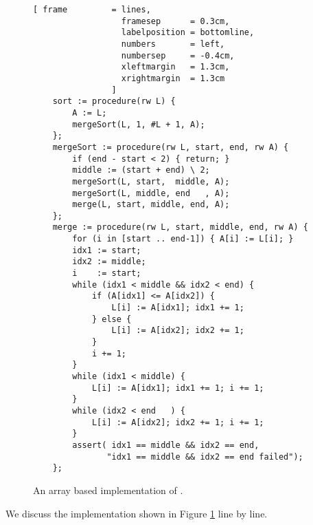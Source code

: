 \begin{figure}[!ht]
  \centering
\begin{Verbatim}[ frame         = lines, 
                  framesep      = 0.3cm, 
                  labelposition = bottomline,
                  numbers       = left,
                  numbersep     = -0.4cm,
                  xleftmargin   = 1.3cm,
                  xrightmargin  = 1.3cm
                ]
    sort := procedure(rw L) {
        A := L;
        mergeSort(L, 1, #L + 1, A); 
    };
    mergeSort := procedure(rw L, start, end, rw A) {
        if (end - start < 2) { return; }
        middle := (start + end) \ 2;
        mergeSort(L, start,  middle, A);  
        mergeSort(L, middle, end   , A);   
        merge(L, start, middle, end, A); 
    };
    merge := procedure(rw L, start, middle, end, rw A) {    
        for (i in [start .. end-1]) { A[i] := L[i]; }
        idx1 := start;
        idx2 := middle;
        i    := start;
        while (idx1 < middle && idx2 < end) {
            if (A[idx1] <= A[idx2]) {
                L[i] := A[idx1]; idx1 += 1;
            } else {
                L[i] := A[idx2]; idx2 += 1;
            }
            i += 1; 
        }
        while (idx1 < middle) { 
            L[i] := A[idx1]; idx1 += 1; i += 1; 
        }
        while (idx2 < end   ) { 
            L[i] := A[idx2]; idx2 += 1; i += 1; 
        }
        assert( idx1 == middle && idx2 == end, 
               "idx1 == middle && idx2 == end failed");
    };
\end{Verbatim}
\vspace*{-0.3cm}
  \caption{An array based implementation of .}
  \label{fig:merge-sort-array.stlx}
\end{figure}
We discuss the implementation shown in Figure \ref{fig:merge-sort-array.stlx} line by line.
